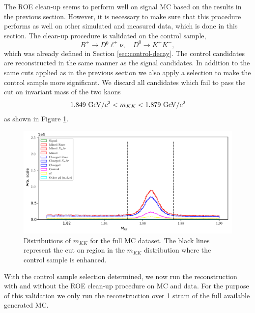 The ROE clean-up seems to perform well on signal MC based on the results in the previous section. However, it is necessary to make sure that this procedure performs as well on other simulated and measured data, which is done in this section. The clean-up procedure is validated on the control sample, $$B^+ \to \bar D {}^0 \ell^+ \nu,\quad D^0 \to K^+K^-,$$
which was already defined in Section \ref{sec:control-decay}. The control candidates are reconstructed in the same manner as the signal candidates. In addition to the same cuts applied as in the previous section we also apply a selection to make the control sample more significant. We discard all candidates which fail to pass the cut on invariant mass of the two kaons
\begin{equation}
1.849\mathrm{~GeV}/c^2 < m_{KK} < 1.879\mathrm{~GeV}/c^2
\end{equation}
as shown in Figure \ref{fig:roe_mKK}.
\begin{figure}[H]
\centering
\captionsetup{width=0.8\linewidth}
\includegraphics[width=\linewidth]{fig/roe_mKK_cut}
\caption{Distributions of $m_{KK}$ for the full MC dataset. The black lines represent the cut on region in the $m_{KK}$ distribution where the control sample is enhanced.}
\label{fig:roe_mKK}
\end{figure}

With the control sample selection determined, we now run the reconstruction with and without the ROE clean-up procedure on MC and data. For the purpose of this validation we only run the reconstruction over 1 stram of the full available generated MC. 

